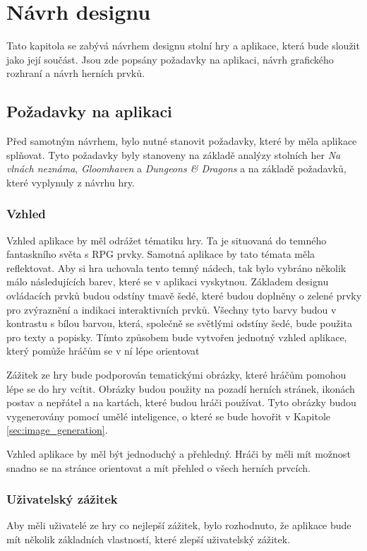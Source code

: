 \chapter{Návrh designu}
Tato kapitola se zabývá návrhem designu stolní hry a aplikace, která bude sloužit jako její součást. Jsou zde popsány požadavky na aplikaci, návrh grafického rozhraní a návrh herních prvků.

\section{Požadavky na aplikaci}
Před samotným návrhem, bylo nutné stanovit požadavky, které by měla aplikace splňovat. Tyto požadavky byly stanoveny na základě analýzy stolních her \textit{Na vlnách neznáma}, \textit{Gloomhaven} a \textit{Dungeons \& Dragons} a na základě požadavků, které vyplynuly z návrhu hry.

\subsection{Vzhled}
Vzhled aplikace by měl odrážet tématiku hry. Ta je situovaná do temného fantaskního světa s RPG prvky. Samotná aplikace by tato témata měla reflektovat. Aby si hra uchovala tento temný nádech, tak bylo vybráno několik málo následujících barev, které se v aplikaci vyskytnou. Základem designu ovládacích prvků budou odstíny tmavě šedé, které budou doplněny o zelené prvky pro zvýraznění a indikaci interaktivních prvků. Všechny tyto barvy budou v kontrastu s bílou barvou, která, společně se světlými odstíny šedé, bude použita pro texty a popisky. Tímto způsobem bude vytvořen jednotný vzhled aplikace, který pomůže hráčům se v ní lépe orientovat

Zážitek ze hry bude podporován tematickými obrázky, které hráčům pomohou lépe se do hry vcítit. Obrázky budou použity na pozadí herních stránek, ikonách postav a nepřátel a na kartách, které budou hráči používat. Tyto obrázky budou vygenerovány pomocí umělé inteligence, o které se bude hovořit v Kapitole \ref{sec:image_generation}.

Vzhled aplikace by měl být jednoduchý a přehledný. Hráči by měli mít možnost snadno se na stránce orientovat a mít přehled o všech herních prvcích.

\subsection{Uživatelský zážitek}
Aby měli uživatelé ze hry co nejlepší zážitek, bylo rozhodnuto, že aplikace bude mít několik základních vlastností, které zlepší uživatelský zážitek.

